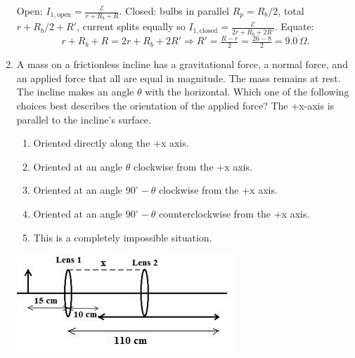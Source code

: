 \documentclass[12pt, a4paper]{article}
\begin{document}
\begin{CJK*}{UTF8}{gbsn}
\begin{enumerate}[itemsep=1.0em, topsep=0.6em]
\begin{solutionbox}
Open: $I_{1,\text{open}}=\tfrac{\mathcal E}{r+R_b+R}$. Closed: bulbs in parallel $R_p=R_b/2$, total $r+R_b/2+R'$, current splits equally so $I_{1,\text{closed}}=\tfrac{\mathcal E}{2r+R_b+2R'}$. Equate:
\[
r+R_b+R=2r+R_b+2R' \Rightarrow R' = \tfrac{R-r}{2} = \tfrac{26-8}{2}=9.0\,\Omega.
\]
\end{solutionbox}

\newpage

\item \label{prob:23}
\noindent\begin{minipage}[t]{0.6\linewidth}
\vspace{0pt}
A mass on a frictionless incline has a gravitational force, a normal force, and an applied force that all are equal in magnitude. The mass remains at rest. The incline makes an angle $\theta$ with the horizontal. Which one of the following choices best describes the orientation of the applied force? The +x-axis is parallel to the incline’s surface.
\begin{enumerate}[label=(\Alph*)]
    \item Oriented directly along the +x axis.
    \item Oriented at an angle $\theta$ clockwise from the +x axis.
    \item Oriented at an angle $90^\circ - \theta$ clockwise from the +x axis.
    \item Oriented at an angle $90^\circ - \theta$ counterclockwise from the +x axis.
    \item This is a completely impossible situation.
\end{enumerate}
\end{minipage}%
\hfill
\begin{minipage}[t]{0.32\linewidth}
\vspace{0pt}
\centering
\includegraphics[width=\linewidth]{Problem_24_Figure.png}
\end{minipage}


\end{enumerate}
\end{CJK*}
\end{document}
